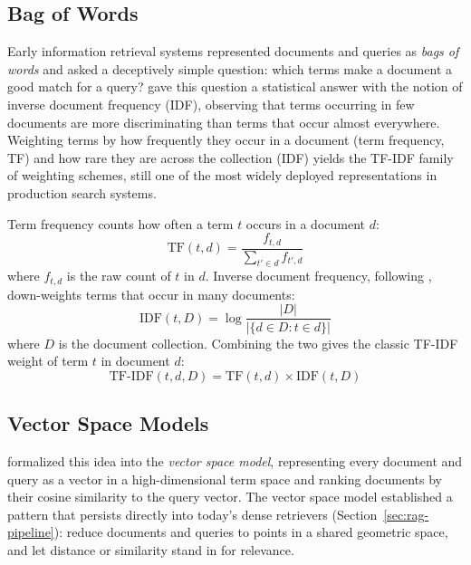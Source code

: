 \subsection{Bag of Words}

Early information retrieval systems represented documents and queries as \emph{bags of words} and asked a deceptively simple question: which terms make a document a good match for a query? \citet{sparckjones1972statistical} gave this question a statistical answer with the notion of inverse document frequency (IDF), observing that terms occurring in few documents are more discriminating than terms that occur almost everywhere. Weighting terms by how frequently they occur in a document (term frequency, TF) and how rare they are across the collection (IDF) yields the TF-IDF family of weighting schemes, still one of the most widely deployed representations in production search systems.

Term frequency counts how often a term $t$ occurs in a document $d$:
\begin{equation}
\mathrm{TF}(t,d) = \frac{f_{t,d}}{\sum_{t' \in d} f_{t',d}}
\label{eq:tf}
\end{equation}
where $f_{t,d}$ is the raw count of $t$ in $d$. Inverse document frequency, following \citet{sparckjones1972statistical}, down-weights terms that occur in many documents:
\begin{equation}
\mathrm{IDF}(t, D) = \log \frac{|D|}{|\{d \in D : t \in d\}|}
\label{eq:idf}
\end{equation}
where $D$ is the document collection. Combining the two gives the classic TF-IDF weight of term $t$ in document $d$:
\begin{equation}
\mathrm{TF\text{-}IDF}(t,d,D) = \mathrm{TF}(t,d) \times \mathrm{IDF}(t,D)
\label{eq:tfidf}
\end{equation}

\subsection{Vector Space Models}

\citet{salton1975vector} formalized this idea into the \emph{vector space model}, representing every document and query as a vector in a high-dimensional term space and ranking documents by their cosine similarity to the query vector. The vector space model established a pattern that persists directly into today's dense retrievers (Section~\ref{sec:rag-pipeline}): reduce documents and queries to points in a shared geometric space, and let distance or similarity stand in for relevance. 

